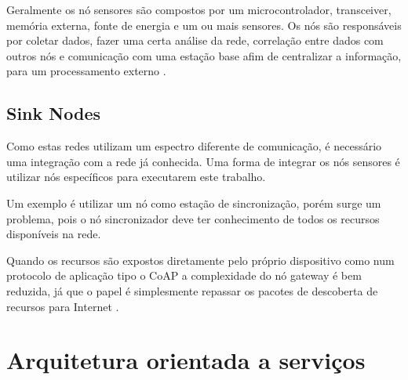 Geralmente os n\'o sensores s\~ao compostos por um microcontrolador, transceiver, mem\'oria externa, fonte de energia e um ou mais sensores. Os n\'os s\~ao respons\'aveis por coletar dados, fazer uma certa an\'alise da rede, correla\c{c}\~ao entre dados com outros n\'os e comunica\c{c}\~ao com uma esta\c{c}\~ao base afim de centralizar a informa\c{c}\~ao, para um processamento externo \cite{dargie2010fundamentals}.

\subsection{Sink Nodes}

Como estas redes utilizam um espectro diferente de comunica\c{c}\~ao, \'e necess\'ario uma integra\c{c}\~ao com a rede j\'a conhecida. Uma forma de integrar os n\'os sensores \'e utilizar n\'os espec\'ificos para executarem este trabalho.

Um exemplo \'e utilizar um n\'o como esta\c{c}\~ao de sincroniza\c{c}\~ao, por\'em surge um problema, pois o n\'o sincronizador deve ter conhecimento de todos os recursos dispon\'iveis na rede.

Quando os recursos s\~ao expostos diretamente pelo pr\'oprio dispositivo como num protocolo de aplica\c{c}\~ao tipo o CoAP a complexidade do n\'o gateway \'e bem reduzida, j\'a que o papel \'e simplesmente repassar os pacotes de descoberta de recursos para Internet \cite{Colitti11deintegrating}.


%
%

\section{Arquitetura orientada a servi\c{c}os}

